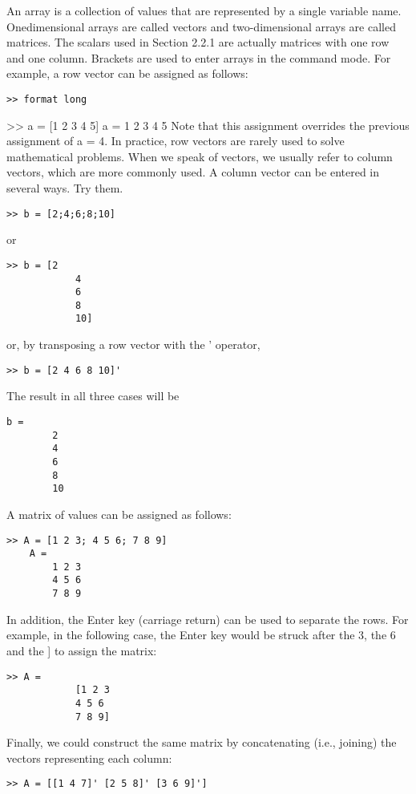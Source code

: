 \documentclass[../main.tex]{subfiles}
\begin{document}
An array is a collection of values that are represented by a single variable name. Onedimensional arrays are called vectors and two-dimensional arrays are called matrices. The
scalars used in Section 2.2.1 are actually matrices with one row and one column.
Brackets are used to enter arrays in the command mode. For example, a row vector can
be assigned as follows:
\begin{lstlisting}[frame=none, numbers=none]
	>> format long
\end{lstlisting}
>> a = [1 2 3 4 5]
a =
1 2 3 4 5
Note that this assignment overrides the previous assignment of a = 4.
In practice, row vectors are rarely used to solve mathematical problems. When we
speak of vectors, we usually refer to column vectors, which are more commonly used. A
column vector can be entered in several ways. Try them.
\begin{lstlisting}[frame=none, numbers=none]
	>> b = [2;4;6;8;10]
\end{lstlisting}
or
\begin{lstlisting}[frame=none, numbers=none]
	>> b = [2
			4
			6
			8
			10]
\end{lstlisting}
or, by transposing a row vector with the ' operator,
\begin{lstlisting}[frame=none, numbers=none]
	>> b = [2 4 6 8 10]'

\end{lstlisting}
The result in all three cases will be
\begin{lstlisting}[frame=none, numbers=none]
	b =
		2
		4
		6
		8
		10
\end{lstlisting}
A matrix of values can be assigned as follows:
\begin{lstlisting}[frame=none, numbers=none]
	>> A = [1 2 3; 4 5 6; 7 8 9]
	A =
		1 2 3
		4 5 6
		7 8 9
\end{lstlisting}
In addition, the Enter key (carriage return) can be used to separate the rows. For example,
in the following case, the Enter key would be struck after the 3, the 6 and the ] to assign the
matrix:
\begin{lstlisting}[frame=none, numbers=none]
	>> A = 
			[1 2 3
			4 5 6
			7 8 9]

\end{lstlisting}
Finally, we could construct the same matrix by concatenating (i.e., joining) the vectors
representing each column:
\begin{lstlisting}[frame=none, numbers=none]
	>> A = [[1 4 7]' [2 5 8]' [3 6 9]']
\end{lstlisting}
\end{document}
